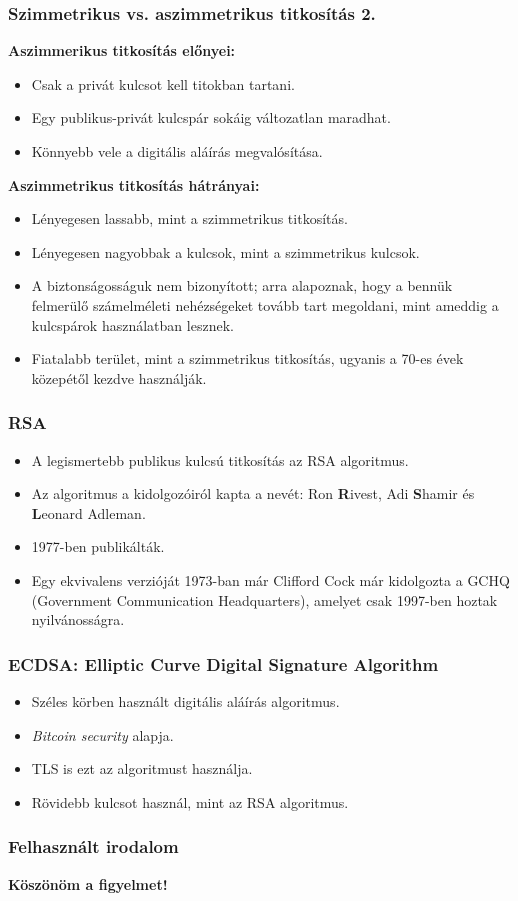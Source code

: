 \documentclass{beamer}
\begin{document}
\begin{frame}
    \frametitle{Szimmetrikus vs. aszimmetrikus titkosítás 2.}

    \textbf{Aszimmerikus titkosítás előnyei:}
    \begin{itemize}
        \item Csak a privát kulcsot kell titokban tartani.
        \item Egy publikus-privát kulcspár sokáig változatlan maradhat.
        \item Könnyebb vele a digitális aláírás megvalósítása.
    \end{itemize}

    \textbf{Aszimmetrikus titkosítás hátrányai:}
    \begin{itemize}
        \item Lényegesen lassabb, mint a szimmetrikus titkosítás.
        \item Lényegesen nagyobbak a kulcsok, mint a szimmetrikus kulcsok.
        \item A biztonságosságuk nem bizonyított; arra alapoznak, hogy a bennük felmerülő számelméleti nehézségeket tovább
              tart megoldani, mint ameddig a kulcspárok használatban lesznek.
        \item Fiatalabb terület, mint a szimmetrikus titkosítás, ugyanis a 70-es évek közepétől kezdve használják.
    \end{itemize}
\end{frame}

\begin{frame}
    \frametitle{RSA}

    \begin{itemize}
        \item A legismertebb publikus kulcsú titkosítás az RSA algoritmus.
        \item Az algoritmus a kidolgozóiról kapta a nevét: Ron \textbf{R}ivest, Adi \textbf{S}hamir és \textbf{L}eonard Adleman.
        \item 1977-ben publikálták.
        \item Egy ekvivalens verzióját 1973-ban már Clifford Cock már kidolgozta a GCHQ (Government Communication Headquarters),
              amelyet csak 1997-ben hoztak nyilvánosságra.
    \end{itemize}
\end{frame}

\begin{frame}
    \frametitle{ECDSA: Elliptic Curve Digital Signature Algorithm}

    \begin{itemize}
        \item Széles körben használt digitális aláírás algoritmus.
        \item \textit{Bitcoin security} alapja.
        \item TLS is ezt az algoritmust használja.
        \item Rövidebb kulcsot használ, mint az RSA algoritmus.
    \end{itemize}
\end{frame}

\begin{frame}
    \frametitle{Felhasznált irodalom}

    \printbibliography[heading=bibintoc]
\end{frame}

\begin{frame}
    \Huge
    \textbf{Köszönöm a figyelmet!}
\end{frame}
\end{document}

